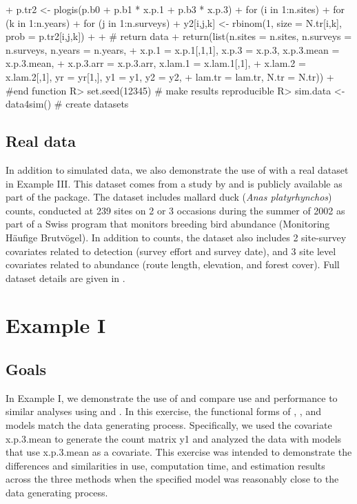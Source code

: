 \documentclass[article]{jss}
\begin{document}
\begin{CodeInput}
{+  p.tr2 <- plogis(p.b0 + p.b1 * x.p.1 + p.b3 * x.p.3)
+  for (i in 1:n.sites){
+    for (k in 1:n.years){
+      for (j in 1:n.surveys){
+        y2[i,j,k] <- rbinom(1, size = N.tr[i,k], prob = p.tr2[i,j,k])
+  }}}
+  # return data
+  return(list(n.sites = n.sites, n.surveys = n.surveys, n.years = n.years,
+              x.p.1 = x.p.1[,1,1], x.p.3 = x.p.3, x.p.3.mean = x.p.3.mean,
+              x.p.3.arr = x.p.3.arr, x.lam.1 = x.lam.1[,1],
+              x.lam.2 = x.lam.2[,1], yr = yr[1,], y1 = y1, y2 = y2,
+              lam.tr = lam.tr, N.tr = N.tr))
+  } #end function
R> set.seed(12345) # make results reproducible
R> sim.data <- data4sim() # create datasets
\end{CodeInput}

\subsection[Real data]{Real data}
In addition to simulated data, we also demonstrate the use of  with a real dataset in Example III. This dataset comes from a study by \cite{Kery_Royle_Schmid_2005} and is publicly available as part of the  package. The dataset includes mallard duck (\emph{Anas platyrhynchos}) counts, conducted at 239 sites on 2 or 3 occasions during the summer of 2002 as part of a Swiss program that monitors breeding bird abundance (Monitoring H\"{a}ufige Brutv\"{o}gel). In addition to counts, the dataset also includes 2 site-survey covariates related to detection (survey effort and survey date), and 3 site level covariates related to abundance (route length, elevation, and forest cover). Full dataset details are given in \cite{Kery_Royle_Schmid_2005}.

\section[Example I]{Example I}
\subsection[Goals]{Goals}
In Example I, we demonstrate the use of  and compare use and performance to similar analyses using  and . In this exercise, the functional forms of , , and  models match the data generating process.  Specifically, we used the covariate x.p.3.mean to generate the count matrix y1 and analyzed the data with models that use x.p.3.mean as a covariate. This exercise was intended to demonstrate the differences and similarities in use, computation time, and estimation results across the three methods when the specified model was reasonably close to the data generating process.
\end{document}
